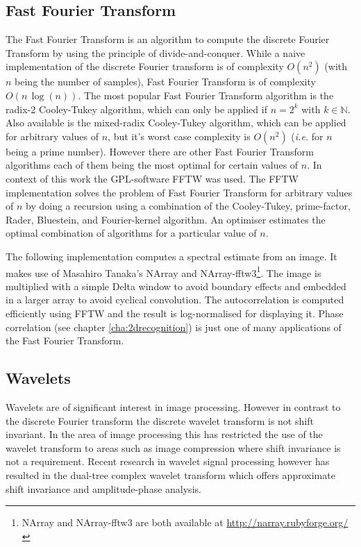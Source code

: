 \documentclass[a4paper,12pt]{book}
\begin{document}
\subsection{Fast Fourier Transform}
The Fast Fourier Transform is an algorithm to compute the discrete Fourier
Transform by using the principle of divide-and-conquer. While a naive
implementation of the discrete Fourier transform is of complexity $O(n^2)$
(with $n$ being the number of samples), Fast Fourier Transform is of
complexity $O(n\,\log(n))$. The most popular Fast Fourier Transform
algorithm is the radix-2 Cooley-Tukey algorithm, which can only be applied
if $n=2^k$ with $k\in\mathbb{N}$. Also available is the mixed-radix
Cooley-Tukey algorithm, which can be applied for arbitrary values of $n$, but
it's worst case complexity is $O(n^2)$ (\emph{i.e.} for $n$ being a prime
number). However there are other Fast Fourier
Transform algorithms each of them being the most optimal for certain values
of $n$. In context of this work the GPL-software FFTW\cite{RefWorks:378} was
used. The FFTW implementation solves the problem of
Fast Fourier Transform for arbitrary values of $n$ by doing a recursion
using a combination of the Cooley-Tukey, prime-factor,
Rader, Bluestein, and Fourier-kernel algorithm. An optimiser estimates the
optimal combination of algorithms for a particular value of $n$.

The following implementation computes a spectral estimate from an image.
It makes use of Masahiro Tanaka's NArray
and NArray-fftw3\footnote{NArray and NArray-fftw3 are both available at
  \url{http://narray.rubyforge.org/}}.
The image is multiplied with a simple Delta window to avoid boundary
effects and embedded in a larger array to avoid cyclical convolution. The
autocorrelation is computed efficiently using FFTW and the result is
log-normalised for displaying it.
%  
Phase correlation (see chapter \ref{cha:2drecognition}) is just one of
many applications of the Fast Fourier Transform.

\subsection{Wavelets} %
Wavelets are of significant interest in image processing. However in
contrast to the discrete Fourier transform the discrete wavelet
transform is not shift invariant. %
In the area of image processing this
has restricted the use of the wavelet transform to areas such as image
compression where shift invariance is not a requirement. Recent research in
wavelet signal processing however has resulted in the dual-tree complex
wavelet transform\cite{RefWorks:398} which offers
approximate shift invariance and amplitude-phase analysis.
\end{document}
